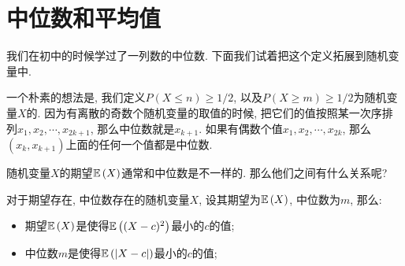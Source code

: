 \section{中位数和平均值}

我们在初中的时候学过了一列数的中位数. 下面我们试着把这个定义拓展到随机变量中. 

一个朴素的想法是, 我们定义$P(X\leq n)\geq 1/2$, 以及$P(X\geq m)\geq 1/2$为随机变量$X$的. 因为有离散的奇数个随机变量的取值的时候, 把它们的值按照某一次序排列$x_1, x_2, \cdots, x_{2k+1}$, 那么中位数就是$x_{k+1}$. 如果有偶数个值$x_1, x_2, \cdots, x_{2k}$, 那么$(x_k, x_{k+1})$上面的任何一个值都是中位数. 

随机变量$X$的期望$\mathbb E\left(X\right)$通常和中位数是不一样的. 那么他们之间有什么关系呢? 

\begin{theorem}
    对于期望存在, 中位数存在的随机变量$X$, 设其期望为$\mathbb E\left(X\right)$, 中位数为$m$, 那么: 
    \begin{itemize}
        \item 期望$\mathbb E\left(X\right)$是使得$\mathbb E\left((X-c)^2\right)$最小的$c$的值;
        \item 中位数$m$是使得$\mathbb E\left(|X-c|\right)$最小的$c$的值;
    \end{itemize}
\end{theorem}

